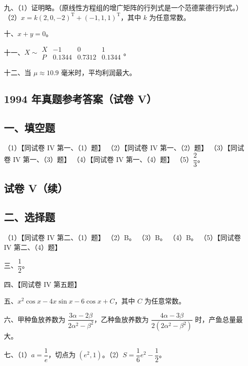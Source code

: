 \documentclass[UTF8,12pt]{ctexart}
\begin{document}
九、（1）证明略。（原线性方程组的增广矩阵的行列式是一个范德蒙德行列式。）（2）\(\displaystyle x=k(2,\allowbreak 0,\allowbreak -2)^{\mathrm T}+(-1,\allowbreak 1,\allowbreak 1)^{\mathrm T}\)，其中 \(\displaystyle k\) 为任意常数。


十、\(\displaystyle x+y=0\)。


十一、\(\displaystyle X\sim\begin{array}{c|ccc}X&-1&0&1\\P&0.1344&0.7312&0.1344\end{array}\)。


十二、当 \(\displaystyle \mu\approx10.9\) 毫米时，平均利润最大。


\subsection*{1994 年真题参考答案（试卷 V）}

\subsection*{一、填空题}

（1）【同试卷 IV 第一、（1）题】 （2）【同试卷 IV 第一、（2）题】 （3）【同试卷 IV 第一、（3）题】 （4）【同试卷 IV 第一、（4）题】 （5）\(\displaystyle \dfrac{\displaystyle 2}{\displaystyle 3}\)。


\subsection*{试卷 V（续）}

\subsection*{二、选择题}

（1）【同试卷 IV 第二、（1）题】 （2）B。 （3）B。 （4）B。 （5）【同试卷 IV 第二、（4）题】


三、\(\displaystyle \dfrac{\displaystyle 1}{\displaystyle 2}\)。


四、【同试卷 IV 第五题】


五、\(\displaystyle x^2\cos x-4x\sin x-6\cos x+C\)，其中 \(\displaystyle C\) 为任意常数。


六、甲种鱼放养数为 \(\displaystyle \dfrac{\displaystyle 3\alpha-2\beta}{\displaystyle 2\alpha^2-\beta^2}\)，乙种鱼放养数为 \(\displaystyle \dfrac{\displaystyle 4\alpha-3\beta}{\displaystyle 2(2\alpha^2-\beta^2)}\) 时，产鱼总量最大。


七、（1）\(\displaystyle a=\dfrac{\displaystyle 1}{\displaystyle e}\)，切点为 \(\displaystyle (e^2,\allowbreak 1)\)。（2）\(\displaystyle S=\dfrac{\displaystyle 1}{\displaystyle 6}e^2-\dfrac{\displaystyle 1}{\displaystyle 2}\)。
\end{document}

